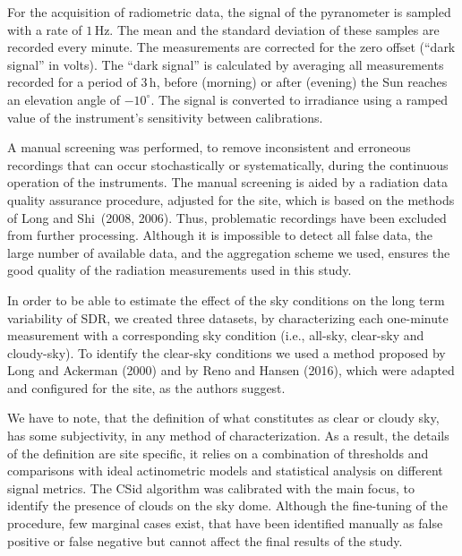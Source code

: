 \documentclass[
  preprint, 3p, authoryear]{article}
\begin{document}
For the acquisition of radiometric data, the signal of the pyranometer is sampled with a rate of \(1\,\text{Hz}\).
The mean and the standard deviation of these samples are recorded every minute.
The measurements are corrected for the zero offset (``dark signal'' in volts).
The ``dark signal'' is calculated by averaging all measurements recorded for a period of
\(3\,\text{h}\),
before (morning) or after (evening) the Sun reaches an elevation angle of
\(-10^\circ\).
The signal is converted to irradiance using a ramped value of the instrument's sensitivity between calibrations.

A manual screening was performed, to remove inconsistent and erroneous recordings that can occur stochastically or systematically, during the continuous operation of the instruments.
The manual screening is aided by a radiation data quality assurance procedure, adjusted for the site, which is based on the methods of
Long and Shi~(2008, 2006).
Thus, problematic recordings have been excluded from further processing.
Although it is impossible to detect all false data, the large number of available data, and the aggregation scheme we used, ensures the good quality of the radiation measurements used in this study.

In order to be able to estimate the effect of the sky conditions on the long term variability of SDR, we created three datasets, by characterizing each one-minute measurement with a corresponding sky condition (i.e., all-sky, clear-sky and cloudy-sky).
To identify the clear-sky conditions we used a method proposed by
Long and Ackerman (2000)
and by
Reno and Hansen (2016),
which were adapted and configured for the site, as the authors suggest.

We have to note, that the definition of what constitutes as clear or cloudy sky, has some subjectivity, in any method of characterization.
As a result, the details of the definition are site specific, it relies on a combination of thresholds and comparisons with ideal actinometric models and statistical analysis on different signal metrics.
The CSid algorithm was calibrated with the main focus, to identify the presence of clouds on the sky dome.
Although the fine-tuning of the procedure, few marginal cases exist, that have been identified manually as false positive or false negative but cannot affect the final results of the study.
\end{document}
